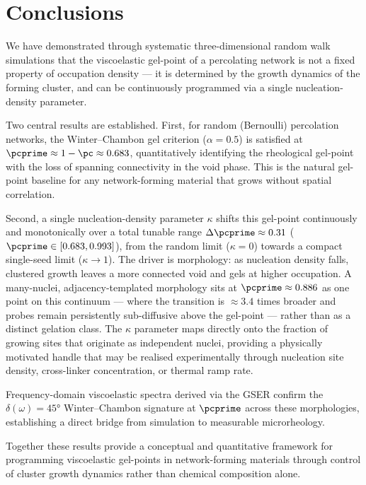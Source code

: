 \section{Conclusions}
\label{sec:conclusions}

We have demonstrated through systematic three-dimensional random walk simulations that the viscoelastic gel-point of a percolating network is not a fixed property of occupation density — it is determined by the growth dynamics of the forming cluster, and can be continuously programmed via a single nucleation-density parameter.

Two central results are established. First, for random (Bernoulli) percolation networks, the Winter--Chambon gel criterion ($\alpha = 0.5$) is satisfied at $\pcprime \approx 1 - \pc \approx 0.683$, quantitatively identifying the rheological gel-point with the loss of spanning connectivity in the void phase. This is the natural gel-point baseline for any network-forming material that grows without spatial correlation.

Second, a single nucleation-density parameter $\kappa$ shifts this gel-point continuously and monotonically over a total tunable range $\Delta\pcprime \approx 0.31$ ($\pcprime \in [0.683, 0.993]$), from the random limit ($\kappa = 0$) towards a compact single-seed limit ($\kappa \to 1$). The driver is morphology: as nucleation density falls, clustered growth leaves a more connected void and gels at higher occupation. A many-nuclei, adjacency-templated morphology sits at $\pcprime \approx 0.886$ as one point on this continuum — where the transition is $\approx 3.4$ times broader and probes remain persistently sub-diffusive above the gel-point — rather than as a distinct gelation class. The $\kappa$ parameter maps directly onto the fraction of growing sites that originate as independent nuclei, providing a physically motivated handle that may be realised experimentally through nucleation site density, cross-linker concentration, or thermal ramp rate.

Frequency-domain viscoelastic spectra derived via the GSER confirm the $\delta(\omega) = 45°$ Winter--Chambon signature at $\pcprime$ across these morphologies, establishing a direct bridge from simulation to measurable microrheology.

Together these results provide a conceptual and quantitative framework for programming viscoelastic gel-points in network-forming materials through control of cluster growth dynamics rather than chemical composition alone.

